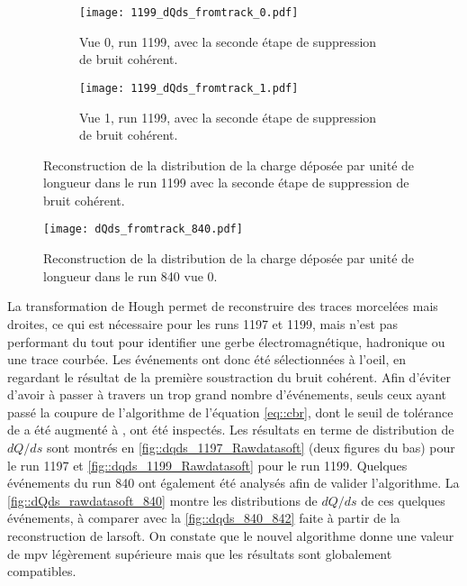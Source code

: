       \begin{figure}[htbp]
        \centering
        \begin{subfigure}[t]{0.48\textwidth}
          \centering
          \texttt{[image: 1199\_dQds\_fromtrack\_0.pdf]}
          \caption{Vue 0, run 1199, avec la seconde étape de suppression de bruit cohérent.}
        \end{subfigure}\hfill
        \begin{subfigure}[t]{0.48\textwidth}
          \centering
          \texttt{[image: 1199\_dQds\_fromtrack\_1.pdf]}
          \caption{Vue 1, run 1199, avec la seconde étape de suppression de bruit cohérent.}
        \end{subfigure}
        \caption[Reconstruction de la distribution de la charge déposée par unité de longueur dans le run 1199]{\label{fig::dqds_1199_Rawdatasoft}Reconstruction de la distribution de la charge déposée par unité de longueur dans le run 1199 avec la seconde étape de suppression de bruit cohérent.}
      \end{figure}

      \begin{figure}[htbp]      
        \centering
        \texttt{[image: dQds\_fromtrack\_840.pdf]}
        \caption[Test de l'algorithme sur le run 840]{\label{fig::dQds_rawdatasoft_840}Reconstruction de la distribution de la charge déposée par unité de longueur dans le run 840 vue 0.}
      \end{figure}

      La transformation de Hough permet de reconstruire des traces morcelées mais droites, ce qui est nécessaire pour les runs 1197 et 1199, mais n'est pas performant du tout pour identifier une gerbe électromagnétique, hadronique ou une trace courbée. Les événements ont donc été sélectionnées à l'oeil, en regardant le résultat de la première soustraction du bruit cohérent. Afin d'éviter d'avoir à passer à travers un trop grand nombre d'événements, seuls ceux ayant passé la coupure de l'algorithme de l'équation \eqref{eq::cbr}, dont le seuil de tolérance de  a été augmenté à , ont été inspectés. Les résultats en terme de distribution de $dQ/ds$ sont montrés en \autoref{fig::dqds_1197_Rawdatasoft} (deux figures du bas) pour le run 1197 et \autoref{fig::dqds_1199_Rawdatasoft} pour le run 1199. Quelques événements du run 840 ont également été analysés afin de valider l'algorithme. La \autoref{fig::dQds_rawdatasoft_840} montre les distributions de $dQ/ds$ de ces quelques événements, à comparer avec la \autoref{fig::dqds_840_842} faite à partir de la reconstruction de \gls{larsoft}. On constate que le nouvel algorithme donne une valeur de \gls{mpv} légèrement supérieure mais que les résultats sont globalement compatibles. 

